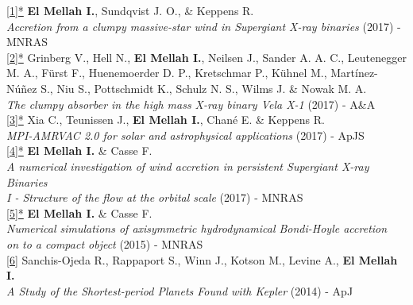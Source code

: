 \begin{flushleft}

\href{http://adsabs.harvard.edu/abs/2017arXiv171108709E}{[1]*} \textbf{El Mellah I.}, Sundqvist J. O., \& Keppens R. \\ 
\emph{Accretion from a clumpy massive-star wind in Supergiant X-ray binaries} (2017) - MNRAS\\
\vspace*{0.3cm}
\href{http://adsabs.harvard.edu/abs/2017arXiv171106743G}{[2]*} Grinberg V., Hell N., \textbf{El Mellah I.}, Neilsen J., Sander A. A. C., Leutenegger M. A., F\"{u}rst F., Huenemoerder D. P., Kretschmar P., K\"{u}hnel M., Mart\'{i}nez-N\'{u}\~{n}ez S., Niu S., Pottschmidt K., Schulz N. S., Wilms J. \& Nowak M. A.\\ 
\emph{The clumpy absorber in the high mass X-ray binary Vela X-1} (2017) - A\&A\\
\vspace*{0.3cm}
\href{https://arxiv.org/abs/1710.06140}{[3]*} Xia C., Teunissen J., \textbf{El Mellah I.}, Chan\'e E. \& Keppens R. \\ 
\emph{MPI-AMRVAC 2.0 for solar and astrophysical applications} (2017) - ApJS\\
\vspace*{0.3cm}
\href{https://academic.oup.com/mnras/article/467/3/2585/2961795/A-numerical-investigation-of-wind-accretion-in}{[4]*} \textbf{El Mellah I.} \& Casse F. \\ 
\emph{A numerical investigation of wind accretion in persistent Supergiant X-ray Binaries}\\
\emph{I - Structure of the flow at the orbital scale} (2017) - MNRAS\\
\vspace*{0.3cm}
\href{https://academic.oup.com/mnras/article-lookup/doi/10.1093/mnras/stv2184}{[5]*} \textbf{El Mellah I.} \& Casse F. \\ 
\emph{Numerical simulations of axisymmetric hydrodynamical Bondi-Hoyle accretion}\\
\emph{on to a compact object} (2015) - MNRAS\\
\vspace*{0.3cm}
\href{http://iopscience.iop.org/article/10.1088/0004-637X/787/1/47/meta}{[6]} Sanchis-Ojeda R., Rappaport S., Winn J., Kotson M., Levine A., \textbf{El Mellah I.}\\
\emph{A Study of the Shortest-period Planets Found with Kepler} (2014) - ApJ\\ 
\vspace*{0.3cm}

\end{flushleft}
